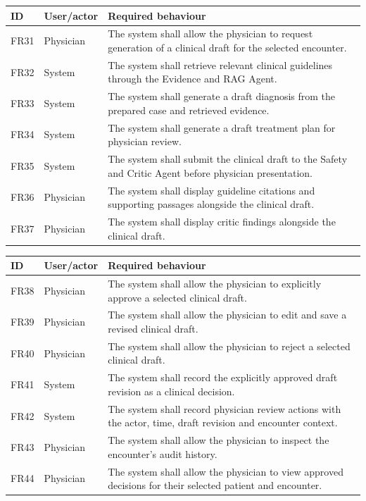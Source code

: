 \begin{reporttable}
\centering
\small
\caption{Draft generation, evidence and critic review.}
\label{tab:kashaf:fr-reasoning}
\begin{tabular}{|p{}|p{}|p{}|}
\hline
ID & User/actor & Required behaviour \\ \hline
FR31 & Physician & The system shall allow the physician to request generation of a clinical draft for the selected encounter. \\ \hline
FR32 & System & The system shall retrieve relevant clinical guidelines through the Evidence and RAG Agent. \\ \hline
FR33 & System & The system shall generate a draft diagnosis from the prepared case and retrieved evidence. \\ \hline
FR34 & System & The system shall generate a draft treatment plan for physician review. \\ \hline
FR35 & System & The system shall submit the clinical draft to the Safety and Critic Agent before physician presentation. \\ \hline
FR36 & Physician & The system shall display guideline citations and supporting passages alongside the clinical draft. \\ \hline
FR37 & Physician & The system shall display critic findings alongside the clinical draft. \\ \hline
\end{tabular}
\end{reporttable}

\begin{reporttable}
\centering
\small
\caption{Physician decisions and audit history.}
\label{tab:kashaf:fr-review}
\begin{tabular}{|p{}|p{}|p{}|}
\hline
ID & User/actor & Required behaviour \\ \hline
FR38 & Physician & The system shall allow the physician to explicitly approve a selected clinical draft. \\ \hline
FR39 & Physician & The system shall allow the physician to edit and save a revised clinical draft. \\ \hline
FR40 & Physician & The system shall allow the physician to reject a selected clinical draft. \\ \hline
FR41 & System & The system shall record the explicitly approved draft revision as a clinical decision. \\ \hline
FR42 & System & The system shall record physician review actions with the actor, time, draft revision and encounter context. \\ \hline
FR43 & Physician & The system shall allow the physician to inspect the encounter's audit history. \\ \hline
FR44 & Physician & The system shall allow the physician to view approved decisions for their selected patient and encounter. \\ \hline
\end{tabular}
\end{reporttable}

